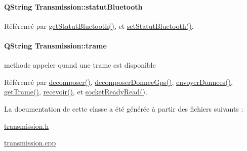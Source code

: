 \paragraph[{\texorpdfstring{statut\+Bluetooth}{statutBluetooth}}]{\setlength{\rightskip}{0pt plus 5cm}Q\+String Transmission\+::statut\+Bluetooth\hspace{0.3cm}{\ttfamily [private]}}\hypertarget{class_transmission_a01afc46fac8c712083225d5dd2386217}{}\label{class_transmission_a01afc46fac8c712083225d5dd2386217}


Référencé par \hyperlink{class_transmission_adf65c6a49fbbc9d25b7b2fca2c410f99}{get\+Statut\+Bluetooth()}, et \hyperlink{class_transmission_a0680d6aab9c17d11e90566c359187ebc}{set\+Statut\+Bluetooth()}.

\paragraph[{\texorpdfstring{trame}{trame}}]{\setlength{\rightskip}{0pt plus 5cm}Q\+String Transmission\+::trame\hspace{0.3cm}{\ttfamily [private]}}\hypertarget{class_transmission_af2e63afdc212381aa023a3bcb48148c1}{}\label{class_transmission_af2e63afdc212381aa023a3bcb48148c1}
methode appeler quand une trame est disponible 

Référencé par \hyperlink{class_transmission_aa2977705ec793b10bf3212a13e67b097}{decomposer()}, \hyperlink{class_transmission_acc25e99cce910d23efe684cad233d30e}{decomposer\+Donnee\+Gps()}, \hyperlink{class_transmission_a21e35372ada18cd35411c0e8c0984fd7}{envoyer\+Donnees()}, \hyperlink{class_transmission_a3fc179158c8c9e2cceba36423ef92505}{get\+Trame()}, \hyperlink{class_transmission_aa54a695d9d1c728ccab04f1d8030da41}{recevoir()}, et \hyperlink{class_transmission_a3beab187cc2056a8f34bc6643fdc0e26}{socket\+Ready\+Read()}.



La documentation de cette classe a été générée à partir des fichiers suivants \+:\begin{DoxyCompactItemize}
\item 
\hyperlink{transmission_8h}{transmission.\+h}\item 
\hyperlink{transmission_8cpp}{transmission.\+cpp}\end{DoxyCompactItemize}
